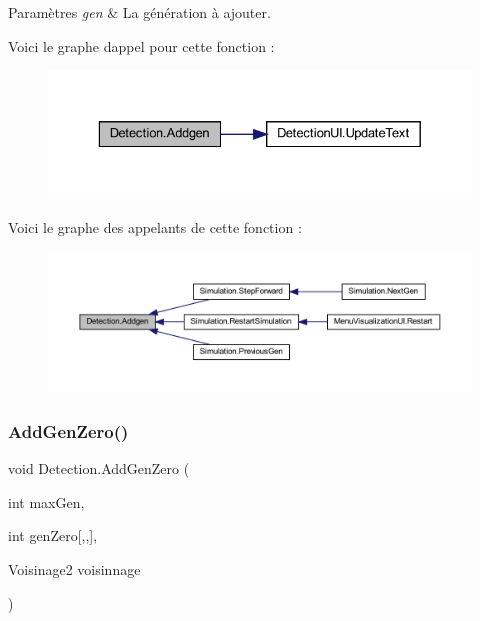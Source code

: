 \begin{DoxyParams}{Paramètres}
{\em gen} & La génération à ajouter.\\
\hline
\end{DoxyParams}
Voici le graphe d\textquotesingle{}appel pour cette fonction \+:\nopagebreak
\begin{figure}[H]
\begin{center}
\leavevmode
\includegraphics[width=329pt]{class_detection_a92c60be1a69ea74b7f7bef04a0e53238_cgraph}
\end{center}
\end{figure}
Voici le graphe des appelants de cette fonction \+:
\nopagebreak
\begin{figure}[H]
\begin{center}
\leavevmode
\includegraphics[width=350pt]{class_detection_a92c60be1a69ea74b7f7bef04a0e53238_icgraph}
\end{center}
\end{figure}
\mbox{\label{class_detection_a96c6d9a8e299f137a4fb84d2ea80e092}} 
\subsubsection{\texorpdfstring{Add\+Gen\+Zero()}{AddGenZero()}}
{\footnotesize\ttfamily void Detection.\+Add\+Gen\+Zero (\begin{DoxyParamCaption}\item[{int}]{max\+Gen,  }\item[{int}]{gen\+Zero\mbox{[},,\mbox{]},  }\item[{Voisinage2}]{voisinnage }\end{DoxyParamCaption})\hspace{0.3cm}{\ttfamily [inline]}}



